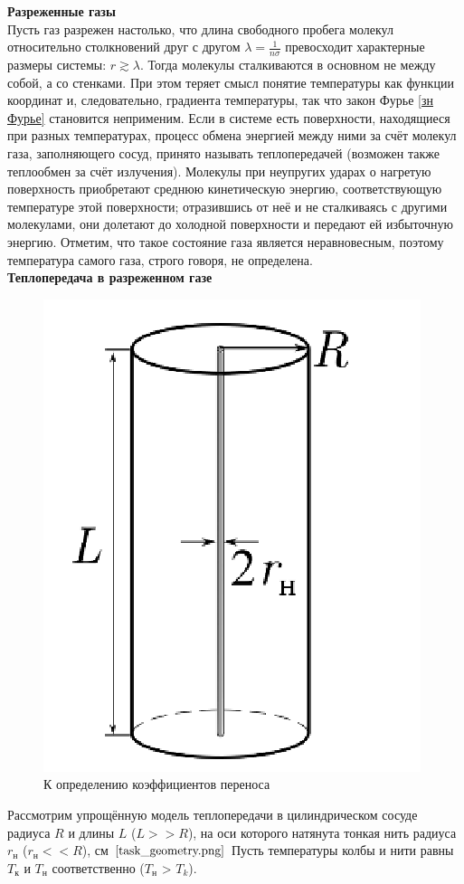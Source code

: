 \documentclass[12pt]{article}
\begin{document}
        \textbf{Разреженные газы}\\
         Пусть газ разрежен настолько, что длина свободного пробега молекул относительно столкновений друг
        с другом $\lambda = \frac{1}{n\sigma}$ превосходит характерные размеры системы: $r \gtrsim \lambda$. Тогда молекулы
        сталкиваются в основном не между собой, а со стенками. При этом теряет смысл понятие
        температуры как функции координат и, следовательно, градиента температуры, так что закон Фурье \ref{зн Фурье}
        становится неприменим. Если в системе есть поверхности, находящиеся при разных температурах, процесс обмена энергией
        между ними за счёт молекул газа, заполняющего сосуд, принято называть теплопередачей (возможен также теплообмен за счёт излучения). Молекулы
        при неупругих ударах о нагретую поверхность приобретают среднюю
        кинетическую энергию, соответствующую температуре этой поверхности;
        отразившись от неё и не сталкиваясь с другими молекулами, они долетают до
        холодной поверхности и передают ей избыточную энергию. Отметим, что такое состояние газа является неравновесным, поэтому
        температура самого газа, строго говоря, не определена.\\
        \textbf{Теплопередача в разреженном газе}\\
        \begin{figure}[H]
            \centering
            \includegraphics[width=0.4\linewidth]{task_geometry.png}
            \caption{К определению коэффициентов переноса}
            \label{fig:mpr}
        \end{figure}
        Рассмотрим упрощённую модель теплопередачи в цилиндрическом сосуде радиуса $R$ и длины $L$ ($L >>R$),
        на оси которого натянута тонкая нить радиуса $r_\text{н}$ ($r_\text{н} << R$), см $\ref{task_geometry.png}$
        Пусть температуры колбы и нити равны $T_\text{к}$ и $T_\text{н}$ соответственно ($T_\text{н}$ > $T_k$).
\end{document}
